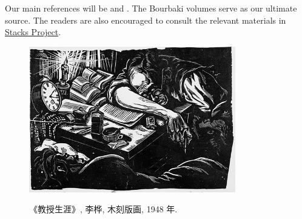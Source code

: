 Our main references will be \cite{Mat80} and \cite{Eis95}. The Bourbaki volumes \cite{Bour83, Bour98} serve as our ultimate source. The readers are also encouraged to consult the relevant materials in \href{https://stacks.math.columbia.edu/}{Stacks Project}.

\vfill
\begin{figure}[h]
	\centering \includegraphics[height=180pt]{JiaoShouShengYa.jpg} \\ \vspace{1em}
	\begin{minipage}{0.7\textwidth}\begin{center}
		\small {} 《教授生涯》, 李桦, 木刻版画, 1948 年.
	\end{center}\end{minipage}
\end{figure}
\vfill
